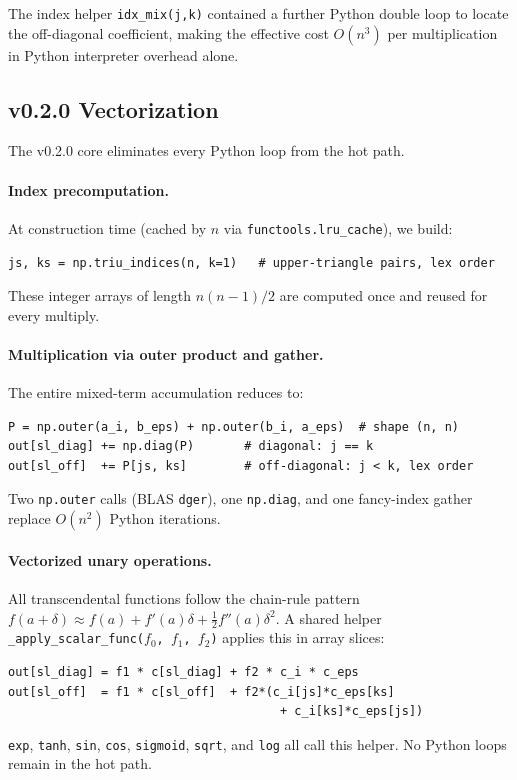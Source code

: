 \documentclass[11pt]{article}
\begin{document}
The index helper \texttt{idx\_mix(j,k)} contained a further Python double loop
to locate the off-diagonal coefficient, making the effective cost
$O(n^3)$ per multiplication in Python interpreter overhead alone.

\subsection{v0.2.0 Vectorization}

The v0.2.0 core eliminates every Python loop from the hot path.

\paragraph{Index precomputation.}
At construction time (cached by $n$ via \texttt{functools.lru\_cache}), we build:
\begin{lstlisting}
js, ks = np.triu_indices(n, k=1)   # upper-triangle pairs, lex order
\end{lstlisting}
These integer arrays of length $n(n-1)/2$ are computed once and reused
for every multiply.

\paragraph{Multiplication via outer product and gather.}
The entire mixed-term accumulation reduces to:
\begin{lstlisting}
P = np.outer(a_i, b_eps) + np.outer(b_i, a_eps)  # shape (n, n)
out[sl_diag] += np.diag(P)       # diagonal: j == k
out[sl_off]  += P[js, ks]        # off-diagonal: j < k, lex order
\end{lstlisting}
Two \texttt{np.outer} calls (BLAS \texttt{dger}), one \texttt{np.diag}, and one
fancy-index gather replace $O(n^2)$ Python iterations.

\paragraph{Vectorized unary operations.}
All transcendental functions follow the chain-rule pattern
$f(a + \delta) \approx f(a) + f'(a)\delta + \tfrac{1}{2}f''(a)\delta^2$.
A shared helper \texttt{\_apply\_scalar\_func($f_0$, $f_1$, $f_2$)} applies this
in array slices:
\begin{lstlisting}
out[sl_diag] = f1 * c[sl_diag] + f2 * c_i * c_eps
out[sl_off]  = f1 * c[sl_off]  + f2*(c_i[js]*c_eps[ks]
                                      + c_i[ks]*c_eps[js])
\end{lstlisting}
\texttt{exp}, \texttt{tanh}, \texttt{sin}, \texttt{cos}, \texttt{sigmoid},
\texttt{sqrt}, and \texttt{log} all call this helper. No Python loops remain in
the hot path.
\end{document}
